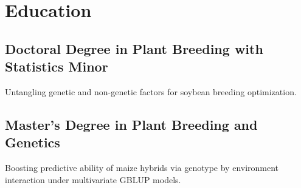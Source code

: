 \documentclass[]{mdkrause_cv_openfont}
\begin{document}
%
%

%
%

%
%

\begin{minipage}[t]{1\textwidth} 






\section{Education} 

\sectionsep

\subsection{Doctoral Degree in Plant Breeding with Statistics Minor}
 Untangling genetic and non-genetic factors for soybean breeding optimization.
\sectionsep

\subsection{Master's Degree in Plant Breeding and Genetics}
 Boosting predictive ability of maize hybrids via genotype by environment interaction under multivariate GBLUP models.


\end{minipage}
\end{document}
